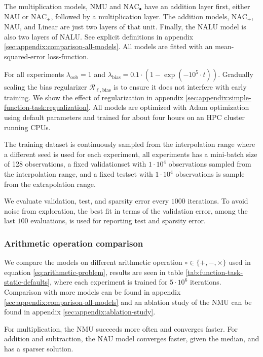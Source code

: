 The multiplication models, NMU and $\mathrm{NAC}_{\bullet}$ have an addition layer first, either NAU or $\mathrm{NAC}_{+}$, followed by a multiplication layer. The addition models, $\mathrm{NAC}_{+}$, NAU, and Linear are just two layers of that unit. Finally, the NALU model is also two layers of NALU. See explicit definitions in appendix \ref{sec:appendix:comparison-all-models}. All models are fitted with an mean-squared-error loss-function.

For all experiments $\lambda_{\mathrm{oob}} = 1$ and $\lambda_{\mathrm{bias}} = 0.1 \cdot (1 - \exp(-10^5 \cdot t))$. Gradually scaling the bias regularizer $\mathcal{R}_{\ell,\mathrm{bias}}$ is to ensure it does not interfere with early training. We show the effect of regularization in appendix \ref{sec:appendix:simple-function-task:regualization}. All models are optimized with Adam optimization \cite{adam-optimization} using default parameters and trained for about four hours on an HPC cluster running  CPUs.

The training dataset is continuously sampled from the interpolation range where a different seed is used for each experiment, all experiments has a mini-batch size of 128 observations, a fixed validationset with $1 \cdot 10^4$ observations sampled from the interpolation range, and a fixed testset with $1 \cdot 10^4$ observations is sample from the extrapolation range.

We evaluate validation, test, and sparsity error every $1000$ iterations. To avoid noise from exploration, the best fit in terms of the validation error, among the last $100$ evaluations, is used for reporting test and sparsity error.

\subsubsection{Arithmetic operation comparison}
We compare the models on different arithmetic operation $\circ \in \{+, -, \times\}$ used in equation \ref{eq:arithmetic-problem}, results are seen in table \ref{tab:function-task-static-defaults}, where each experiment is trained for $5 \cdot 10^6$ iterations. Comparison with more models can be found in appendix \ref{sec:appendix:comparison-all-models} and an ablation study of the NMU can be found in appendix \ref{sec:appendix:ablation-study}.

For multiplication, the NMU succeeds more often and converges faster. For addition and subtraction, the NAU model converges faster, given the median, and has a sparser solution.

